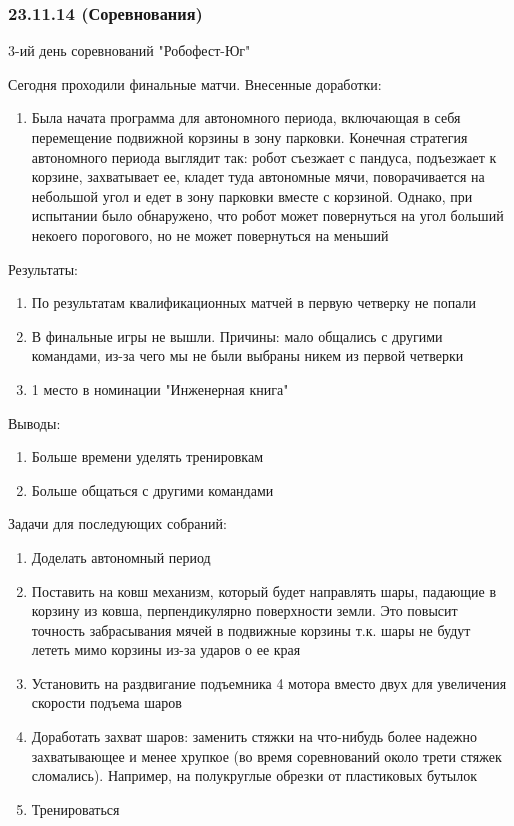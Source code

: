 \subsubsection{23.11.14 (Соревнования)}
\begin{center}
	3-ий день соревнований "Робофест-Юг"
\end{center}
Сегодня проходили финальные матчи.
Внесенные доработки:
\begin{enumerate}
	\item Была начата программа для автономного периода, включающая в себя перемещение подвижной корзины в зону парковки. Конечная стратегия автономного периода выглядит так: робот съезжает с пандуса, подъезжает к корзине, захватывает ее, кладет туда автономные мячи, поворачивается на небольшой угол и едет в зону парковки вместе с корзиной. Однако, при испытании было обнаружено, что робот может повернуться на угол больший некоего порогового, но не может повернуться на меньший
\end{enumerate}
Результаты:
\begin{enumerate}
	\item По результатам квалификационных матчей в первую четверку не попали
	\item В финальные игры не вышли. Причины: мало общались с другими командами, из-за чего мы не были выбраны никем из первой четверки
	\item 1 место в номинации "Инженерная книга"
\end{enumerate}
Выводы:
\begin{enumerate}
	\item Больше времени уделять тренировкам
	\item Больше общаться с другими командами
\end{enumerate}
Задачи для последующих собраний:
\begin{enumerate}
	\item Доделать автономный период
	\item Поставить на ковш механизм, который будет направлять шары, падающие в корзину из ковша, перпендикулярно поверхности земли. Это повысит точность забрасывания мячей в подвижные корзины т.к. шары не будут лететь мимо корзины из-за ударов о ее края
	\item Установить на раздвигание подъемника 4 мотора вместо двух для увеличения скорости подъема шаров
	\item Доработать захват шаров: заменить стяжки на что-нибудь более надежно захватывающее и менее хрупкое (во время соревнований около трети стяжек сломались). Например, на полукруглые обрезки от пластиковых бутылок
	\item Тренироваться
\end{enumerate}
\fillpage